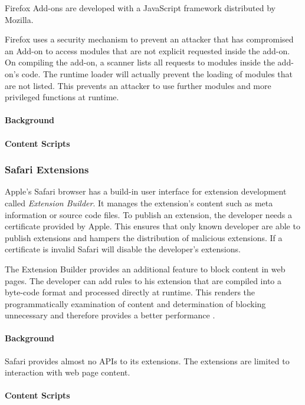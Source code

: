 	Firefox Add-ons are developed with a JavaScript framework distributed by Mozilla. 


	
	Firefox uses a security mechanism to prevent an attacker that has compromised an Add-on to access modules that are not explicit requested inside the add-on. On compiling the add-on, a scanner lists all requests to modules inside the add-on's code. The runtime loader will actually prevent the loading of modules that are not listed. This prevents an attacker to use further modules and more privileged functions at runtime.
	
\paragraph{Background}

	

\paragraph{Content Scripts}


\subsubsection{Safari Extensions}

	Apple's Safari browser has a build-in user interface for extension development called \textit{Extension Builder}. It manages the extension's content such as meta information or source code files. To publish an extension, the developer needs a certificate provided by Apple. This ensures that only known developer are able to publish extensions and hampers the distribution of malicious extensions. If a certificate is invalid Safari will disable the developer's extensions.
	
	The Extension Builder provides an additional feature to block content in web pages. The developer can add rules to his extension that are compiled into a byte-code format and processed directly at runtime. This renders the programmatically examination of content and determination of blocking unnecessary and therefore provides a better performance \cite{safariContentBlockingRules}.

\paragraph{Background}

	Safari provides almost no APIs to its extensions. The extensions are limited to interaction with web page content.
	
\paragraph{Content Scripts}
